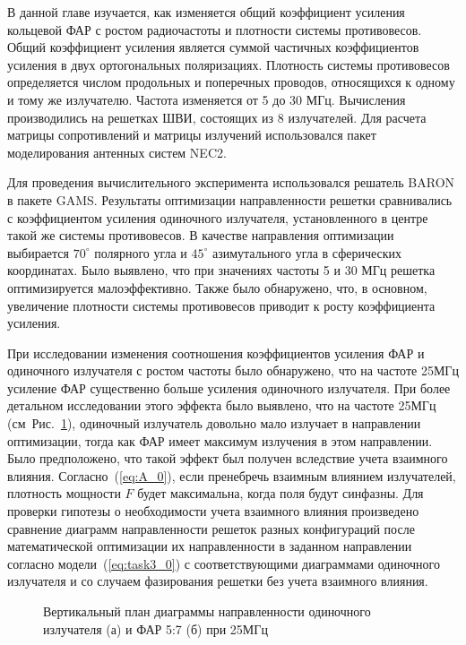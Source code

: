 В данной главе изучается, как изменяется общий коэффициент усиления кольцевой ФАР с ростом радиочастоты и плотности системы противовесов. Общий коэффициент усиления является суммой частичных коэффициентов усиления в  двух ортогональных поляризациях. Плотность системы противовесов определяется числом продольных и поперечных проводов, относящихся к одному и тому же излучателю. Частота изменяется от 5 до 30 МГц. Вычисления производились на решетках ШВИ, состоящих из 8 излучателей. Для расчета матрицы сопротивлений и матрицы излучений использовался пакет моделирования антенных систем NEC2.

Для проведения вычислительного эксперимента использовался решатель BARON в пакете GAMS. Результаты оптимизации направленности решетки сравнивались с коэффициентом усиления одиночного излучателя, установленного в центре такой же системы противовесов. В качестве направления оптимизации выбирается $70^{\circ}$ полярного угла и $45^{\circ}$ азимутального угла в сферических координатах. Было выявлено, что при значениях частоты 5 и 30 МГц решетка оптимизируется малоэффективно. Также было обнаружено, что, в основном, увеличение плотности системы противовесов приводит к росту коэффициента усиления.

При исследовании изменения соотношения коэффициентов усиления ФАР и одиночного излучателя с ростом частоты было обнаружено, что на частоте 25МГц усиление ФАР существенно больше усиления одиночного излучателя. При более детальном исследовании этого эффекта было выявлено, что на частоте 25МГц (см~Рис.~\ref{ris:f25mhs_0}), одиночный излучатель довольно мало излучает в направлении оптимизации, тогда как ФАР имеет максимум излучения в этом направлении. Было предположено, что такой эффект был получен вследствие учета взаимного влияния. Согласно~(\ref{eq:A_0}), если пренебречь взаимным влиянием излучателей, плотность мощности $F$ будет максимальна, когда поля будут синфазны. Для проверки гипотезы о необходимости учета взаимного влияния произведено сравнение диаграмм направленности решеток разных конфигураций после математической оптимизации их направленности в заданном направлении согласно модели~(\ref{eq:task3_0}) с соответствующими диаграммами одиночного излучателя и со случаем фазирования решетки без учета взаимного влияния.

\begin{figure}[!h]
\begin{minipage}[h]{0.49\linewidth}
\end{minipage}
\hfill
\begin{minipage}[h]{0.49\linewidth}
\end{minipage}
\caption{Вертикальный план диаграммы направленности одиночного излучателя (а) и ФАР 5:7 (б) при 25МГц}
\label{ris:f25mhs_0}
\end{figure}

